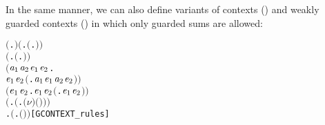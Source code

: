 In the same manner, we can also define variants of contexts () and weakly guarded
contexts () in which only guarded sums are allowed:
\begin{alltt}
\HOLTokenTurnstile{}  \ensuremath{(}\HOLTokenLambda{}. \ensuremath{)} \HOLSymConst{\HOLTokenConj{}} \ensuremath{(}\HOLSymConst{\HOLTokenForall{}}.  \ensuremath{(}\HOLTokenLambda{}. \ensuremath{)}\ensuremath{)} \HOLSymConst{\HOLTokenConj{}}
   \ensuremath{(}\HOLSymConst{\HOLTokenForall{}} .   \HOLSymConst{\HOLTokenImp{}}  \ensuremath{(}\HOLTokenLambda{}. \HOLSymConst{\ensuremath{\ldotp}} \ensuremath{)}\ensuremath{)} \HOLSymConst{\HOLTokenConj{}}
   \ensuremath{(}\HOLSymConst{\HOLTokenForall{}}\ensuremath{\HOLBoundVar{a}\sb{\mathrm{1}}} \ensuremath{\HOLBoundVar{a}\sb{\mathrm{2}}} \ensuremath{\HOLBoundVar{e}\sb{\mathrm{1}}} \ensuremath{\HOLBoundVar{e}\sb{\mathrm{2}}}.
         \ensuremath{\HOLBoundVar{e}\sb{\mathrm{1}}} \HOLSymConst{\HOLTokenConj{}}  \ensuremath{\HOLBoundVar{e}\sb{\mathrm{2}}} \HOLSymConst{\HOLTokenImp{}}  \ensuremath{(}\HOLTokenLambda{}. \ensuremath{\HOLBoundVar{a}\sb{\mathrm{1}}}\HOLSymConst{\ensuremath{\ldotp}}\ensuremath{\HOLBoundVar{e}\sb{\mathrm{1}}}  \HOLSymConst{\ensuremath{+}} \ensuremath{\HOLBoundVar{a}\sb{\mathrm{2}}}\HOLSymConst{\ensuremath{\ldotp}}\ensuremath{\HOLBoundVar{e}\sb{\mathrm{2}}} \ensuremath{)}\ensuremath{)} \HOLSymConst{\HOLTokenConj{}}
   \ensuremath{(}\HOLSymConst{\HOLTokenForall{}}\ensuremath{\HOLBoundVar{e}\sb{\mathrm{1}}} \ensuremath{\HOLBoundVar{e}\sb{\mathrm{2}}}.  \ensuremath{\HOLBoundVar{e}\sb{\mathrm{1}}} \HOLSymConst{\HOLTokenConj{}}  \ensuremath{\HOLBoundVar{e}\sb{\mathrm{2}}} \HOLSymConst{\HOLTokenImp{}}  \ensuremath{(}\HOLTokenLambda{}. \ensuremath{\HOLBoundVar{e}\sb{\mathrm{1}}}  \HOLSymConst{\ensuremath{\mid}} \ensuremath{\HOLBoundVar{e}\sb{\mathrm{2}}} \ensuremath{)}\ensuremath{)} \HOLSymConst{\HOLTokenConj{}}
   \ensuremath{(}\HOLSymConst{\HOLTokenForall{}} .   \HOLSymConst{\HOLTokenImp{}}  \ensuremath{(}\HOLTokenLambda{}. \ensuremath{(\nu}\ensuremath{)} \ensuremath{(} \ensuremath{)}\ensuremath{)}\ensuremath{)} \HOLSymConst{\HOLTokenConj{}}
   \HOLSymConst{\HOLTokenForall{}} .   \HOLSymConst{\HOLTokenImp{}}  \ensuremath{(}\HOLTokenLambda{}.  \ensuremath{(} \ensuremath{)} \ensuremath{)}\hfill{[GCONTEXT_rules]}
\end{alltt}
